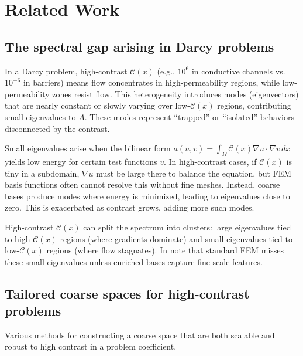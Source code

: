\chapter{Related Work}\label{ch:literature}\newpage
\section{The spectral gap arising in Darcy problems}\label{sec:spectral_gap_darcy}
In a Darcy problem, high-contrast $ \mathcal{C}(x) $ (e.g., $ 10^6 $ in conductive channels vs.\ $ 10^{-6} $ in barriers) means flow concentrates in high-permeability regions, while low-permeability zones resist flow. This heterogeneity introduces modes (eigenvectors) that are nearly constant or slowly varying over low-$ \mathcal{C}(x) $ regions, contributing small eigenvalues to $ A $. These modes represent ``trapped'' or ``isolated'' behaviors disconnected by the contrast.

Small eigenvalues arise when the bilinear form $ a(u, v) = \int_{\Omega} \mathcal{C}(x) \nabla u \cdot \nabla v \, dx $ yields low energy for certain test functions $ v $. In high-contrast cases, if $ \mathcal{C}(x) $ is tiny in a subdomain, $ \nabla u $ must be large there to balance the equation, but FEM basis functions often cannot resolve this without fine meshes. Instead, coarse bases produce modes where energy is minimized, leading to eigenvalues close to zero. This is exacerbated as contrast grows, adding more such modes.

High-contrast $ \mathcal{C}(x) $ can split the spectrum into clusters: large eigenvalues tied to high-$ \mathcal{C}(x) $ regions (where gradients dominate) and small eigenvalues tied to low-$ \mathcal{C}(x) $ regions (where flow stagnates). In \cite{msfem_for_darcy_Efendiev2011} note that standard FEM misses these small eigenvalues unless enriched bases capture fine-scale features.

\section{Tailored coarse spaces for high-contrast problems}\label{sec:tailored_coarse_spaces}
Various methods for constructing a coarse space that are both scalable and robust to high contrast in a problem coefficient.

